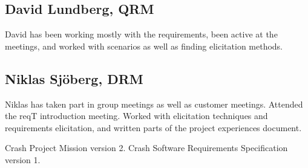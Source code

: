 \documentclass[10pt]{article}
\begin{document}
\subsection{David Lundberg, QRM}
David has been working mostly with the requirements, been active at the meetings, and worked with scenarios as well as finding elicitation methods.
\subsection{Niklas Sjöberg, DRM}
Niklas has taken part in group meetings as well as customer meetings. Attended the reqT introduction meeting. Worked with elicitation techniques and requirements elicitation, and written parts of the project experiences document. 

\begin{thebibliography}{1}
 Crash Project Mission version 2. 
 Crash Software Requirements Specification version 1. 

\end{thebibliography}
\end{document}
